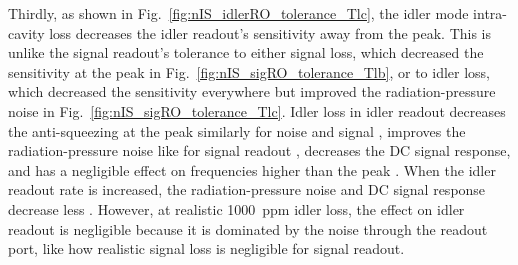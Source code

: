 Thirdly, as shown in Fig.~\ref{fig:nIS_idlerRO_tolerance_Tlc}, the idler mode intra-cavity loss decreases the idler readout's sensitivity away from the peak. This is unlike the signal readout's tolerance to either signal loss, which decreased the sensitivity at the peak in Fig.~\ref{fig:nIS_sigRO_tolerance_Tlb}, or to idler loss, which decreased the sensitivity everywhere but improved the radiation-pressure noise in Fig.~\ref{fig:nIS_sigRO_tolerance_Tlc}. Idler loss in idler readout decreases the anti-squeezing at the peak similarly for noise and signal , improves the radiation-pressure noise like for signal readout , decreases the DC signal response, and has a negligible effect on frequencies higher than the peak . When the idler readout rate is increased, the radiation-pressure noise and DC signal response decrease less . However, at realistic 1000~ppm idler loss, the effect on idler readout is negligible because it is dominated by the noise through the readout port, like how realistic signal loss is negligible for signal readout.

